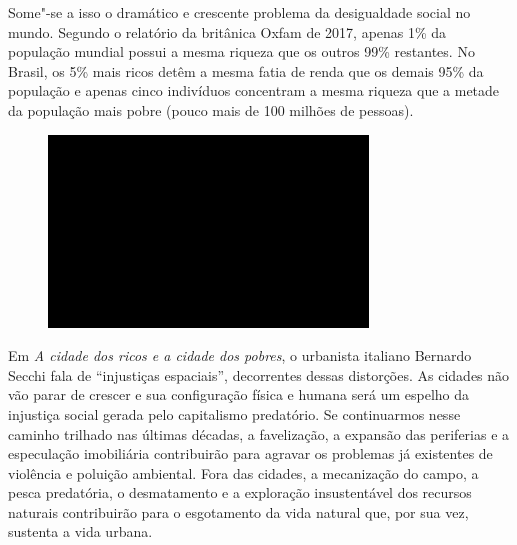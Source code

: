 Some"-se a isso o dramático e crescente problema da desigualdade social
no mundo. Segundo o relatório da  britânica Oxfam de 2017, apenas 1\%
da população mundial possui a mesma riqueza que os outros 99\%
restantes. No Brasil, os 5\% mais ricos detêm a mesma fatia de renda que
os demais 95\% da população e apenas cinco indivíduos concentram a mesma
riqueza que a metade da população mais pobre (pouco mais de 100 milhões
de pessoas).

\begin{figure}[!ht]

\centering
 \includegraphics[width=85mm]{./imgs/im1.jpg}
\caption{\tiny{}}

\end{figure}

Em \emph{A cidade dos ricos e a cidade dos pobres}, o urbanista italiano Bernardo Secchi fala de ``injustiças espaciais'', decorrentes dessas distorções. As cidades não vão parar de crescer e sua configuração física e humana será um espelho da injustiça
social gerada pelo capitalismo predatório. Se continuarmos nesse caminho
trilhado nas últimas décadas, a favelização, a expansão das periferias e
a especulação imobiliária contribuirão para agravar os problemas já
existentes de violência e poluição ambiental. Fora das cidades, a
mecanização do campo, a pesca predatória, o desmatamento e a exploração
insustentável dos recursos naturais contribuirão para o esgotamento da
vida natural que, por sua vez, sustenta a vida urbana.

